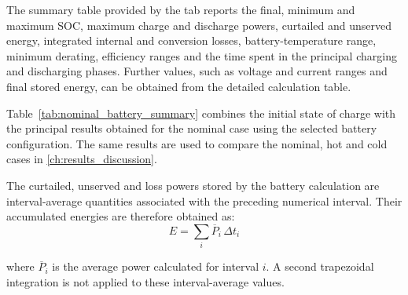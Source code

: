 The summary table provided by the tab reports the final, minimum and maximum
SOC, maximum charge and discharge powers, curtailed and unserved energy,
integrated internal and conversion losses, battery-temperature range, minimum
derating, efficiency ranges and the time spent in the principal charging and
discharging phases. Further values, such as voltage and current ranges and
final stored energy, can be obtained from the detailed calculation table.

Table~\ref{tab:nominal_battery_summary} combines the initial state of charge
with the principal results obtained for the nominal case using the selected
battery configuration. The same results are used to compare the nominal, hot
and cold cases in \autoref{ch:results_discussion}.


\NominalBatterySummaryTable[0.84\textwidth]

The curtailed, unserved and loss powers stored by the battery calculation are
interval-average quantities associated with the preceding numerical interval.
Their accumulated energies are therefore obtained as:
\begin{equation}
    E
    =
    \sum_i
    \overline{P}_i\,\Delta t_i
\end{equation}

where \(\overline{P}_i\) is the average power calculated for interval \(i\).
A second trapezoidal integration is not applied to these interval-average
values.

\FloatBarrier

